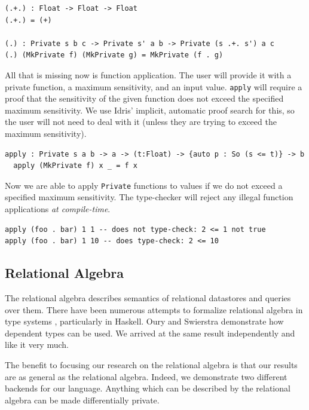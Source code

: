 \documentclass[12pt]{article}
\begin{document}
\begin{lstlisting}[caption=Composing function sensitivity]
(.+.) : Float -> Float -> Float
(.+.) = (+)

(.) : Private s b c -> Private s' a b -> Private (s .+. s') a c
(.) (MkPrivate f) (MkPrivate g) = MkPrivate (f . g)
\end{lstlisting}

All that is missing now is function application.
The user will provide it with a private function, a maximum sensitivity, and an input value.
\texttt{apply} will require a proof that the sensitivity of the given function does not exceed the specified maximum sensitivity.
We use Idris' implicit, automatic proof search for this, so the user will not need to deal with it (unless they are trying to exceed the maximum sensitivity).

\begin{lstlisting}[caption="Private function application"]
  apply : Private s a b -> a -> (t:Float) -> {auto p : So (s <= t)} -> b
  apply (MkPrivate f) x _ = f x
\end{lstlisting}

Now we are able to apply \texttt{Private} functions to values if we do not exceed a specified maximum sensitivity.
The type-checker will reject any illegal function applications \textit{at compile-time}.

\begin{lstlisting}
apply (foo . bar) 1 1 -- does not type-check: 2 <= 1 not true
apply (foo . bar) 1 10 -- does type-check: 2 <= 10
\end{lstlisting}

\subsection{Relational Algebra}

The relational algebra describes semantics of relational datastores and queries over them.
There have been numerous attempts to formalize relational algebra in type systems %
, particularly in Haskell.
Oury and Swierstra demonstrate how dependent types can be used\cite{OurySwierstra08PowerOfPi}.
We arrived at the same result independently and like it very much.

The benefit to focusing our research on the relational algebra is that our results are as general as the relational algebra.
Indeed, we demonstrate two different backends for our language.
Anything which can be described by the relational algebra can be made differentially private. %
\end{document}

